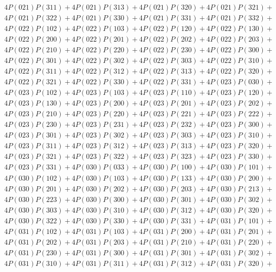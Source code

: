\begin{align*}
	4P(021)P(311) + 4P(021)P(313) + 4P(021)P(320) + 4P(021)P(321)+ \\ 
	4P(021)P(322) + 4P(021)P(330) + 4P(021)P(331) + 4P(021)P(332)+ \\ 
	4P(022)P(102) + 4P(022)P(103) + 4P(022)P(120) + 4P(022)P(130)+ \\ 
	4P(022)P(200) + 4P(022)P(201) + 4P(022)P(202) + 4P(022)P(203)+ \\ 
	4P(022)P(210) + 4P(022)P(220) + 4P(022)P(230) + 4P(022)P(300)+ \\ 
	4P(022)P(301) + 4P(022)P(302) + 4P(022)P(303) + 4P(022)P(310)+ \\ 
	4P(022)P(311) + 4P(022)P(312) + 4P(022)P(313) + 4P(022)P(320)+ \\ 
	4P(022)P(321) + 4P(022)P(330) + 4P(022)P(331) + 4P(023)P(030)+ \\ 
	4P(023)P(102) + 4P(023)P(103) + 4P(023)P(110) + 4P(023)P(120)+ \\ 
	4P(023)P(130) + 4P(023)P(200) + 4P(023)P(201) + 4P(023)P(202)+ \\ 
	4P(023)P(210) + 4P(023)P(220) + 4P(023)P(221) + 4P(023)P(222)+ \\ 
	4P(023)P(230) + 4P(023)P(231) + 4P(023)P(232) + 4P(023)P(300)+ \\ 
	4P(023)P(301) + 4P(023)P(302) + 4P(023)P(303) + 4P(023)P(310)+ \\ 
	4P(023)P(311) + 4P(023)P(312) + 4P(023)P(313) + 4P(023)P(320)+ \\ 
	4P(023)P(321) + 4P(023)P(322) + 4P(023)P(323) + 4P(023)P(330)+ \\ 
	4P(023)P(331) + 4P(030)P(033) + 4P(030)P(100) + 4P(030)P(101)+ \\ 
	4P(030)P(102) + 4P(030)P(103) + 4P(030)P(133) + 4P(030)P(200)+ \\ 
	4P(030)P(201) + 4P(030)P(202) + 4P(030)P(203) + 4P(030)P(213)+ \\ 
	4P(030)P(223) + 4P(030)P(300) + 4P(030)P(301) + 4P(030)P(302)+ \\ 
	4P(030)P(303) + 4P(030)P(310) + 4P(030)P(312) + 4P(030)P(320)+ \\ 
	4P(030)P(322) + 4P(030)P(330) + 4P(030)P(331) + 4P(031)P(101)+ \\ 
	4P(031)P(102) + 4P(031)P(103) + 4P(031)P(200) + 4P(031)P(201)+ \\ 
	4P(031)P(202) + 4P(031)P(203) + 4P(031)P(210) + 4P(031)P(220)+ \\ 
	4P(031)P(230) + 4P(031)P(300) + 4P(031)P(301) + 4P(031)P(302)+ \\ 
	4P(031)P(310) + 4P(031)P(311) + 4P(031)P(312) + 4P(031)P(320)+ \\ 

\end{align*}
